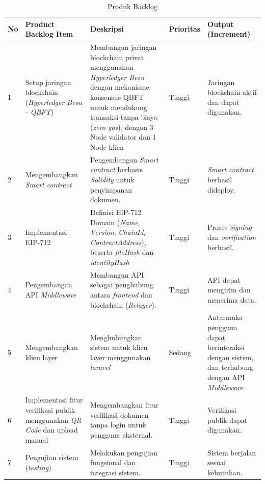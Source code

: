 		\begin{landscape}
			\renewcommand{\arraystretch}{1.3}
			\begin{longtable}{|
			>{\centering\arraybackslash}p{0.8cm}|
			>{\raggedright\arraybackslash}p{4cm}|
			p{8.5cm}|
			>{\centering\arraybackslash}p{2cm}|
			p{5cm}|}

			\caption{Produk Backlog}
			\label{tab:produk_backlog} \\

			\hline
			\textbf{No} &
			\textbf{Product Backlog Item} &
			\textbf{Deskripsi} &
			\textbf{Prioritas} &
			\textbf{Output (Increment)} \\ \hline
			\endfirsthead

			\hline
			\endfoot

			\hline
			\endlastfoot

			1 &
			Setup jaringan blockchain (\textit{Hyperledger Besu - QBFT}) &
			Membangun jaringan blockchain privat menggunakan \textit{Hyperledger Besu} dengan mekanisme konsensus QBFT untuk mendukung transaksi tanpa biaya (\textit{zero gas}), dengan 3 Node validator dan 1 Node klien &
			Tinggi &
			Jaringan blockchain aktif dan dapat digunakan. \\ \hline

			2 &
			Mengembangkan \textit{Smart contract}  &
			Pengembangan \textit{Smart contract} berbasis \textit{Solidity} untuk penyimpanan dokumen. &
			Tinggi &
			\textit{Smart contract} berhasil dideploy. \\ \hline

			3 &
			Implementasi EIP-712 &
			Definisi EIP-712 Domain (\textit{Name}, \textit{Version}, \textit{ChainId}, \textit{ContractAddress}), beserta \textit{fileHash} dan \textit{identityHash} &
			Tinggi &
			Proses \textit{signing} dan \textit{verification} berhasil. \\ \hline

			4 &
			Pengembangan API \textit{Middleware} &
			Membangun API sebagai penghubung antara \textit{frontend} dan blockchain (\textit{Relayer}). &
			Tinggi &
			API dapat mengirim dan menerima data. \\ \hline

			5 &
			Mengembangkan klien layer &
			Menghubungkan sistem untuk klien layer menggunakan \textit{laravel} &
			Sedang &
			Antarmuka pengguna dapat berinteraksi dengan sistem, dan terhubung dengan API \textit{Middleware} \\ \hline

			6 &
			Implementasi fitur verifikasi publik menggunakan \textit{QR Code} dan upload manual &
			Mengembangkan fitur verifikasi dokumen tanpa login untuk pengguna eksternal. &
			Tinggi &
			Verifikasi publik dapat digunakan. \\ \hline

			7 &
			Pengujian sistem (\textit{testing}) &
			Melakukan pengujian fungsional dan integrasi sistem. &
			Tinggi &
			Sistem berjalan sesuai kebutuhan. \\ \hline
				
			\end{longtable}
		\end{landscape}


